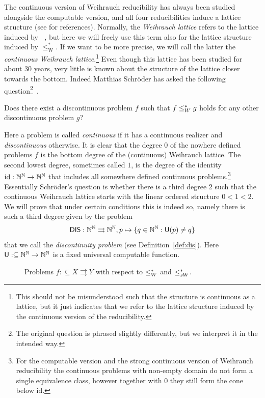 \documentclass{amsart}
\def\IN{{\Bbb{N}}}
\def\In{\subseteq}
\def\mto{\rightrightarrows}
\def\U{{\mathsf{{U}}}}
\def\leqW{\mathop{\leq_{\mathrm{W}}}}
\def\leqW{\mathop{\leq_{\mathrm{W}}}}
\def\id{{\mathrm{id}}}
\def\DIS{\mathsf{DIS}}
\begin{document}
The continuous version of Weihrauch reducibility has always been studied alongside the computable
version, and all four reducibilities induce a lattice structure (see \cite{BGP21} for references). 
Normally, the {\em Weihrauch lattice} refers
to the lattice induced by $\leqW$, but here we will freely use this term also for the lattice structure induced by $\leq_\mathrm{W}^*$. If we want to be more precise, we will call the latter the {\em continuous Weihrauch lattice}.\footnote{This should not be misunderstood such that the structure is continuous as a lattice, but it just indicates that we
refer to the lattice structure induced by the continuous version of the reducibility.}
Even though this lattice has been studied for about 30 years, very little is known about the structure of the lattice closer
towards the bottom. Indeed Matthias Schr\"oder has asked the following question\footnote{The original question is phrased slightly differently, but we interpret it in the intended way.}~\cite[Question~5.9]{BDMP19}.

\begin{question}
Does there exist a discontinuous problem $f$ such that $f\leq_{\rm W}^*g$ holds for any other 
discontinuous problem $g$?
\end{question}

Here a problem is called {\em continuous} if it has a continuous realizer and {\em discontinuous} otherwise.
It is clear that the degree $0$ of the nowhere defined problems $f$ is the bottom degree of the (continuous)
Weihrauch lattice. The second lowest degree, sometimes called $1$, is the degree of the identity $\id:\IN^\IN\to\IN^\IN$
that includes all somewhere defined continuous problems.\footnote{For the computable version and the strong continuous version of Weihrauch reducibility the continuous problems with non-empty domain do not form a single equivalence class, however together with $0$ they still form the cone below $\id$.}
Essentially Schr\"oder's question is whether there is a third degree $2$ such that the continuous Weihrauch lattice starts 
with the linear ordered structure $0<1<2$. We will prove that under certain conditions this is indeed so, namely there is such a third degree given by the problem 
\[\DIS:\IN^\IN\mto\IN^\IN,p\mapsto\{q\in\IN^\IN:\U(p)\not=q\}\]
that we call the {\em discontinuity problem} (see Definition~\ref{def:dis}). 
Here $\U:\In\IN^\IN\to\IN^\IN$ is a fixed universal computable function.

\begin{figure}
\caption{Problems $f:\In X\mto Y$ with respect to $\leq_{\rm W}^*$ and $\leq_{\rm sW}^*$.} 
\label{fig:DIS}
\end{figure}
\end{document}
